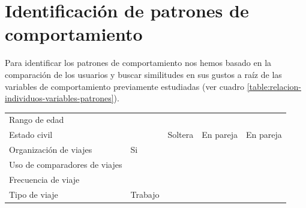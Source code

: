 \section{Identificación de patrones de comportamiento}
Para identificar los patrones de comportamiento nos hemos basado en la comparación de los usuarios y buscar similitudes en sus gustos a raíz de las variables de comportamiento previamente estudiadas (ver cuadro \ref{table:relacion-individuos-variables-patrones}).
\begin{table}[H]
    \centering
    \begin{tabular}{|p{10em}|p{7em}|p{7em}|p{7em}|p{8em}|}
        \cline{2-5}
        \cellcolor{black}                 & \cellcolor{black}{\textcolor{white}{Madi}}  & \cellcolor{black}{\textcolor{white}{Sofía}}   & \cellcolor{black}{\textcolor{white}{Alberto}} & \cellcolor{black}{\textcolor{white}{Beatriz}}     \\ \hline
        Rango de edad                     &                                             & \cellcolor{green}{18 - 25}                    & \cellcolor{green}{18 - 25}                    & \cellcolor{green}{18 - 25}                        \\ \hline
        Estado civil                      &                                             & Soltera                                       & En pareja                                     & En pareja                                         \\ \hline
        Organización de viajes            & Si                                          & \cellcolor{green}{Si}                         & \cellcolor{green}{Si}                         & \cellcolor{green}{Si}                             \\ \hline
        Uso de comparadores de viajes     & \cellcolor{yellow}{No}                      & \cellcolor{purple}{Kayak, Skyscanner, Trivago}& \cellcolor{yellow}{No}                        & \cellcolor{purple}{eDreams, comparador de Google} \\ \hline
        Frecuencia de viaje               & \cellcolor{yellow}{Alta}                    & \cellcolor{purple}{Media}                     & \cellcolor{yellow}{Alta}                      & \cellcolor{purple}{Baja}                          \\ \hline
        Tipo de viaje                     & Trabajo                                     & \cellcolor{green}{Ocio}                       & \cellcolor{green}{Ocio}                       & \cellcolor{green}{Ocio}                           \\ \hline

\end{tabular}
\end{table}
